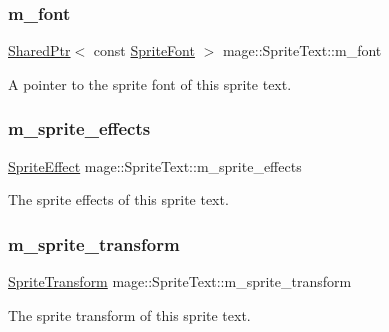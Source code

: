 \subsubsection{\texorpdfstring{m\+\_\+font}{m\_font}}
{\footnotesize\ttfamily \hyperlink{namespacemage_a1e01ae66713838a7a67d30e44c67703e}{Shared\+Ptr}$<$ const \hyperlink{classmage_1_1_sprite_font}{Sprite\+Font} $>$ mage\+::\+Sprite\+Text\+::m\+\_\+font\hspace{0.3cm}{\ttfamily [private]}}

A pointer to the sprite font of this sprite text. \hypertarget{classmage_1_1_sprite_text_acc64029be6634cac0651ceaaa0f84a3b}{}\label{classmage_1_1_sprite_text_acc64029be6634cac0651ceaaa0f84a3b} 
\subsubsection{\texorpdfstring{m\+\_\+sprite\+\_\+effects}{m\_sprite\_effects}}
{\footnotesize\ttfamily \hyperlink{namespacemage_ad62ebdf0e7aae0caf1535a4ea3f056ea}{Sprite\+Effect} mage\+::\+Sprite\+Text\+::m\+\_\+sprite\+\_\+effects\hspace{0.3cm}{\ttfamily [private]}}

The sprite effects of this sprite text. \hypertarget{classmage_1_1_sprite_text_ade755cb73d8db4f388063cda1a351c50}{}\label{classmage_1_1_sprite_text_ade755cb73d8db4f388063cda1a351c50} 
\subsubsection{\texorpdfstring{m\+\_\+sprite\+\_\+transform}{m\_sprite\_transform}}
{\footnotesize\ttfamily \hyperlink{classmage_1_1_sprite_transform}{Sprite\+Transform} mage\+::\+Sprite\+Text\+::m\+\_\+sprite\+\_\+transform\hspace{0.3cm}{\ttfamily [private]}}

The sprite transform of this sprite text. \hypertarget{classmage_1_1_sprite_text_aadda462c0b67282ef86a7cb2b235367c}{}\label{classmage_1_1_sprite_text_aadda462c0b67282ef86a7cb2b235367c} 
